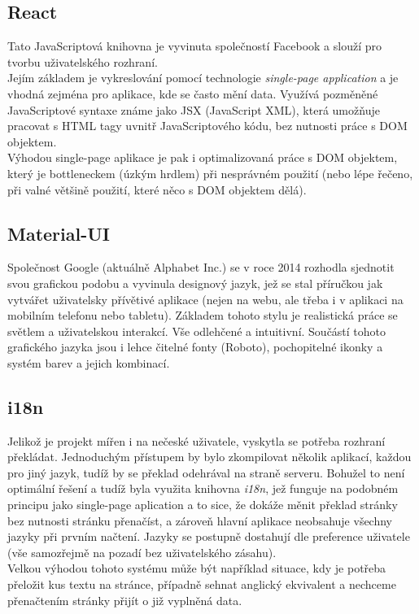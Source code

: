\subsection{React}
Tato JavaScriptová knihovna je vyvinuta společností Facebook a slouží pro tvorbu uživatelského rozhraní.\\
Jejím základem je vykreslování pomocí technologie \textit{single-page application} a je vhodná zejména pro aplikace, kde se často mění data.
Využívá pozměněné JavaScriptové syntaxe známe jako JSX (JavaScript XML), která umožňuje
pracovat s HTML tagy uvnitř JavaScriptového kódu, bez nutnosti práce s DOM objektem.\\
Výhodou single-page aplikace je pak i optimalizovaná práce s DOM objektem, který je bottleneckem
(úzkým hrdlem) při nesprávném použití (nebo lépe řečeno, při valné většině použití, které
něco s DOM objektem dělá).

\subsection{Material-UI}
Společnost Google (aktuálně Alphabet Inc.) se v roce 2014 rozhodla sjednotit svou grafickou podobu a
vyvinula designový jazyk, jež se stal příručkou jak vytvářet uživatelsky přívětivé aplikace
(nejen na webu, ale třeba i v aplikaci na mobilním telefonu nebo tabletu).
Základem tohoto stylu je realistická práce se světlem a uživatelskou interakcí.
Vše odlehčené a intuitivní. Součástí tohoto grafického jazyka jsou i
lehce čitelné fonty (Roboto), pochopitelné ikonky a systém barev a jejich kombinací.

\subsection{i18n}
Jelikož je projekt mířen i na nečeské uživatele, vyskytla se potřeba rozhraní překládat.
Jednoduchým přístupem by bylo zkompilovat několik aplikací, každou pro jiný jazyk, tudíž
by se překlad odehrával na straně serveru. Bohužel to není optimální řešení a
tudíž byla využita knihovna \textit{i18n}, jež funguje na podobném principu jako single-page aplication a
to sice, že dokáže měnit překlad stránky bez nutnosti stránku přenačíst, a zároveň hlavní aplikace
neobsahuje všechny jazyky při prvním načtení. Jazyky se postupně dostahují dle preference uživatele
(vše samozřejmě na pozadí bez uživatelského zásahu).\\
Velkou výhodou tohoto systému může být například situace, kdy je potřeba přeložit kus textu na stránce,
případně sehnat anglický ekvivalent a nechceme přenačtením stránky přijít o již vyplněná data.

